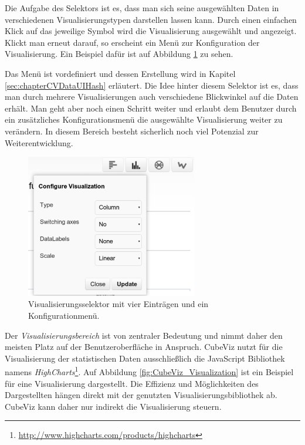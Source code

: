 \documentclass[11pt]{article}
\newcommand{\com}[1]{\marginpar{\em {\small{#1}}}} %
\begin{document}
\noindent
Die Aufgabe des Selektors ist es, dass man sich seine ausgewählten Daten in verschiedenen Visualisierungstypen darstellen lassen kann. Durch einen einfachen Klick auf das jeweilige Symbol wird die Visualisierung ausgewählt und angezeigt. Klickt man erneut darauf, so erscheint ein Menü zur Konfiguration der Visualisierung. Ein Beispiel dafür ist auf Abbildung \ref{fig:CubeViz_ViszSelector} zu sehen.

Das Menü \com{Kapitel \ref{sec:chapterCVDataUIHash} \\ S. \pageref{sec:chapterCVDataUIHash}} ist vordefiniert und dessen Erstellung wird in Kapitel \ref{sec:chapterCVDataUIHash} erläutert. Die Idee hinter diesem Selektor ist es, dass man durch mehrere Visualisierungen auch verschiedene Blickwinkel auf die Daten erhält. Man geht aber noch einen Schritt weiter und erlaubt dem Benutzer durch ein zusätzliches Konfigurationsmenü die ausgewählte Visualisierung weiter zu verändern. In diesem Bereich besteht sicherlich noch viel Potenzial zur Weiterentwicklung. 


%
%
\begin{figure}[h!]
    \centering
    \includegraphics[width=7.5cm]{CubeViz/ViszSelector.pdf}
    \caption{Visualisierungsselektor mit vier Einträgen und ein Konfigurationmenü.}
    \label{fig:CubeViz_ViszSelector}
\end{figure}

\noindent
Der \textit{Visualisierungsbereich}\com{Visualisie-rungsbereich} ist von zentraler Bedeutung und nimmt daher den meisten Platz auf der Benutzeroberfläche in Anspruch. CubeViz nutzt für die Visualisierung der statistischen Daten ausschließlich die JavaScript Bibliothek namens \textit{HighCharts}\footnote{\url{http://www.highcharts.com/products/highcharts}}. Auf Abbildung \ref{fig:CubeViz_Visualization} ist ein Beispiel für eine Visualisierung dargestellt. Die Effizienz und Möglichkeiten des Dargestellten hängen direkt mit der genutzten Visualisierungsbibliothek ab. CubeViz kann daher nur indirekt die Visualisierung steuern.
\end{document}

